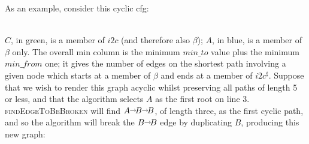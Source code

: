\newcommand{\shortrightarrow}{\begin{tikzpicture}[baseline= -1ex*.75]
    \draw[->] (0,0) -- ++(.25,0);
  \end{tikzpicture}
  \hspace{-1pt}
}

As an example, consider this cyclic \gls{cfg}:\\
\noindent \centerline{
}\\
\noindent $C$, in green, is a member of $i2c$ (and therefore also
$\beta$); $A$, in blue, is a member of $\beta$ only.  The overall min
column is the minimum $\mathit{min\_to}$ value plus the minimum
$\mathit{min\_from}$ one; it gives the number of edges on the shortest
path involving a given node which starts at a member of $\beta$ and
ends at a member of $i2c^\sharp$.  Suppose that we wish to render this
graph acyclic whilst preserving all paths of length 5 or less, and
that the algorithm selects $A$ as the first root on line 3.
\textsc{findEdgeToBeBroken} will find $A \shortrightarrow B
\shortrightarrow B$, of length three, as the first cyclic path, and so
the algorithm will break the $B \shortrightarrow B$ edge by
duplicating $B$, producing this new graph:\\
